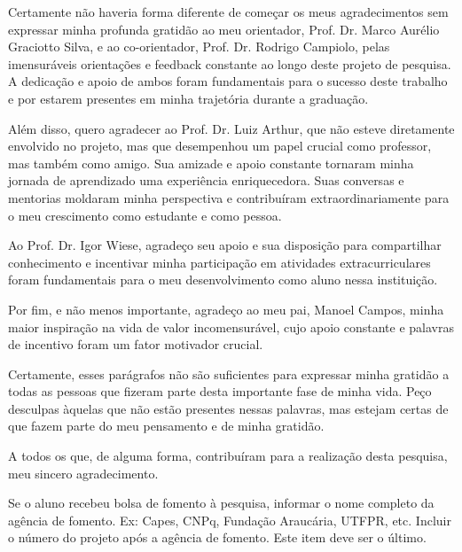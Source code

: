 
\begin{agradecimentos}%

Certamente não haveria forma diferente de começar os meus agradecimentos sem expressar minha profunda gratidão ao meu orientador, Prof. Dr. Marco Aurélio Graciotto Silva, e ao co-orientador, Prof. Dr. Rodrigo Campiolo, pelas imensuráveis orientações e feedback constante ao longo deste projeto de pesquisa. A dedicação e apoio de ambos foram fundamentais para o sucesso deste trabalho e por estarem presentes em minha trajetória durante a graduação.

Além disso, quero agradecer ao Prof. Dr. Luiz Arthur, que não esteve diretamente envolvido no projeto, mas que desempenhou um papel crucial como professor, mas também como amigo. Sua amizade e apoio constante tornaram minha jornada de aprendizado uma experiência enriquecedora. Suas conversas e mentorias moldaram minha perspectiva e contribuíram extraordinariamente para o meu crescimento como estudante e como pessoa.

Ao Prof. Dr. Igor Wiese, agradeço seu apoio e sua disposição para compartilhar conhecimento e incentivar minha participação em atividades extracurriculares foram fundamentais para o meu desenvolvimento como aluno nessa instituição.

Por fim, e não menos importante, agradeço ao meu pai, Manoel Campos, minha maior inspiração na vida de valor incomensurável, cujo apoio constante e palavras de incentivo foram um fator motivador crucial.

Certamente, esses parágrafos não são suficientes para expressar minha gratidão a todas as pessoas que fizeram parte desta importante fase de minha vida. Peço desculpas àquelas que não estão presentes nessas palavras, mas estejam certas de que fazem parte do meu pensamento e de minha gratidão.

A todos os que, de alguma forma, contribuíram para a realização desta pesquisa, meu sincero agradecimento.

Se o aluno recebeu bolsa de fomento à pesquisa, informar o nome completo da agência de fomento. Ex: Capes, CNPq, Fundação Araucária, UTFPR, etc. Incluir o número do projeto após a agência de fomento. Este item deve ser o último.

\end{agradecimentos}
